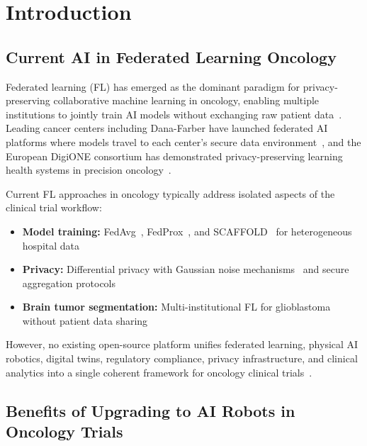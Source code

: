 \documentclass[10pt]{article}
\begin{document}
\section{Introduction}
\label{sec:introduction}

\subsection{Current AI in Federated Learning Oncology}

Federated learning (FL) has emerged as the dominant paradigm for privacy-preserving collaborative machine learning in oncology, enabling multiple institutions to jointly train AI models without exchanging raw patient data~\cite{mcmahan2017fedavg, rieke2020fl_medicine}. Leading cancer centers including Dana-Farber have launched federated AI platforms where models travel to each center's secure data environment~\cite{danafarberfederated2025}, and the European DigiONE consortium has demonstrated privacy-preserving learning health systems in precision oncology~\cite{digione2024}.

Current FL approaches in oncology typically address isolated aspects of the clinical trial workflow:
\begin{itemize}
  \item \textbf{Model training:} FedAvg~\cite{mcmahan2017fedavg}, FedProx~\cite{li2020fedprox}, and SCAFFOLD~\cite{karimireddy2020scaffold} for heterogeneous hospital data
  \item \textbf{Privacy:} Differential privacy with Gaussian noise mechanisms~\cite{dwork2014dp} and secure aggregation protocols
  \item \textbf{Brain tumor segmentation:} Multi-institutional FL for glioblastoma without patient data sharing~\cite{sheller2020fl_brain}
\end{itemize}

However, no existing open-source platform unifies federated learning, physical AI robotics, digital twins, regulatory compliance, privacy infrastructure, and clinical analytics into a single coherent framework for oncology clinical trials~\cite{kawchak2026fl}.

\subsection{Benefits of Upgrading to AI Robots in Oncology Trials}
\end{document}
